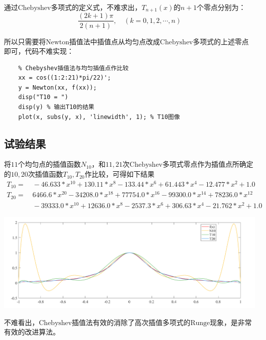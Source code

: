 \documentclass[12pt, a4paper, oneside]{ctexart}
\begin{document}
\begin{appendices}
通过$\text{Chebyshev}$多项式的定义式，不难求出，$T_{n+1}(x)$的$n+1$个零点分别为：
\begin{equation*}
    \frac{(2k+1)\pi}{2(n+1)},\quad(k=0,1,2,\cdots,n)
\end{equation*}

所以只需要将$\text{Newton}$插值法中插值点从均匀点改成$\text{Chebyshev}$多项式的上述零点即可，代码不难实现：

\begin{lstlisting}
    % Chebyshev插值法与均匀插值点作比较
    xx = cos((1:2:21)*pi/22)';
    y = Newton(xx, f(xx));
    disp("T10 = ")
    disp(y) % 输出T10的结果
    plot(x, subs(y, x), 'linewidth', 1); % T10图像
\end{lstlisting}

\subsection{试验结果}

将$11$个均匀点的插值函数$N_{10}$，和$11,21$次$\text{Chebyshev}$多项式零点作为插值点所确定的$10,20$次插值函数$T_{10},T_{20}$作比较，可得如下结果
\begin{equation*}
    \begin{aligned}
        T_{10} =&\ - 46.633*x^{10} + 130.11*x^8 - 133.44*x^6 + 61.443*x^4 - 12.477*x^2  + 1.0\\
        T_{20} =&\ 6466.6*x^{20} - 34208.0*x^{18} + 77754.0*x^{16} - 99300.0*x^{14} + 78236.0*x^{12} \\
        &\ - 39333.0*x^{10} + 12636.0*x^8 - 2537.3*x^6 + 306.63*x^4 - 21.762*x^2 + 1.0
    \end{aligned}
\end{equation*}

\centerline{
    \includegraphics[width=1.2\textwidth]{figure1.png}
}
不难看出，$\text{Chebyshev}$插值法有效的消除了高次插值多项式的$\text{Runge}$现象，是非常有效的改进算法。

\newpage

\end{appendices}
\end{document}
